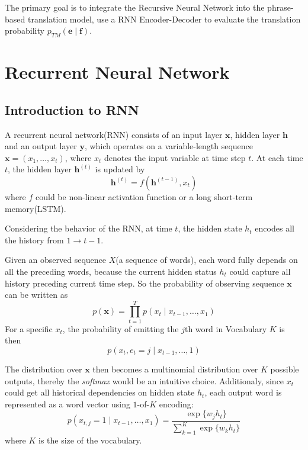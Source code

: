 \documentclass[11pt,letterpaper]{article}
\begin{document}
The primary goal is to integrate the Recursive Neural Network into the phrase-based translation model, use a RNN Encoder-Decoder to evaluate the translation probability $p_{TM}(\mathbf{e}\mid \mathbf{f})$. 

\section{Recurrent Neural Network}
\subsection{Introduction to RNN}
A recurrent neural network(RNN) consists of an input layer $\mathbf{x}$, hidden layer $\mathbf{h}$ and an output layer $\mathbf{y}$, which operates on a variable-length sequence $\mathbf{x} = (x_1, \dots, x_t)$, where $x_t$ denotes the input variable at time step $t$. At each time $t$, the hidden layer $\mathbf{h}^{(t)} $ is updated by 
\begin{equation}
\mathbf{h}^{(t)} = f(\mathbf{h}^{(t-1)}, x_t)
\end{equation}
where $f$ could be non-linear activation function or a long short-term memory(LSTM).

Considering the behavior of the RNN, at time $t$, the hidden state $h_t$ encodes all the history from $1 \to t-1$.

Given an observed sequence $X$(a sequence of words), each word fully depends on all the preceding words, because the current hidden status $h_t$ could capture all history preceding current time step. So the probability of observing sequence $\mathbf{x}$ can be written as
\begin{equation}
p(\mathbf{x}) = \prod_{t=1}^Tp(x_t \mid x_{t-1},\dots, x_1)
\end{equation}
For a specific $x_t$, the probability of emitting the $j$th word in Vocabulary $K$ is  then
$$ p(x_t, e_t=j \mid x_{t-1}, \dots, 1)$$ 

The distribution over $\mathbf{x}$ then becomes a multinomial distribution over $K$ possible outputs, thereby the \textit{softmax} would be an intuitive choice. Additionaly, since $x_t$ could get all historical dependencies on hidden state $h_t$, each output word is represented as a word vector using $1$-of-$K$ encoding:
\begin{equation}
p(x_{t,j} = 1 \mid x_{t-1}, \dots, x_1) = \frac{\exp\{w_j h_t\}}{\sum\limits_{k=1}^K \exp\{w_k h_t\}}
\end{equation}
where $K$ is the size of the vocabulary.
\end{document}
